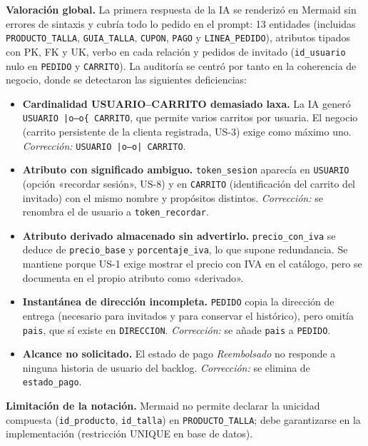 \textbf{Valoración global.} La primera respuesta de la IA se renderizó en Mermaid sin errores de sintaxis y cubría todo lo pedido en el prompt: 13 entidades (incluidas \texttt{PRODUCTO\_TALLA}, \texttt{GUIA\_TALLA}, \texttt{CUPON}, \texttt{PAGO} y \texttt{LINEA\_PEDIDO}), atributos tipados con PK, FK y UK, verbo en cada relación y pedidos de invitado (\texttt{id\_usuario} nulo en \texttt{PEDIDO} y \texttt{CARRITO}). La auditoría se centró por tanto en la coherencia de negocio, donde se detectaron las siguientes deficiencias:
\begin{itemize}[leftmargin=*,nosep]
\item \textbf{Cardinalidad USUARIO--CARRITO demasiado laxa.} La IA generó \texttt{USUARIO |o--o\{ CARRITO}, que permite varios carritos por usuaria. El negocio (carrito persistente de la clienta registrada, US-3) exige como máximo uno. \emph{Corrección:} \texttt{USUARIO |o--o| CARRITO}.
\item \textbf{Atributo con significado ambiguo.} \texttt{token\_sesion} aparecía en \texttt{USUARIO} (opción «recordar sesión», US-8) y en \texttt{CARRITO} (identificación del carrito del invitado) con el mismo nombre y propósitos distintos. \emph{Corrección:} se renombra el de usuario a \texttt{token\_recordar}.
\item \textbf{Atributo derivado almacenado sin advertirlo.} \texttt{precio\_con\_iva} se deduce de \texttt{precio\_base} y \texttt{porcentaje\_iva}, lo que supone redundancia. Se mantiene porque US-1 exige mostrar el precio con IVA en el catálogo, pero se documenta en el propio atributo como «derivado».
\item \textbf{Instantánea de dirección incompleta.} \texttt{PEDIDO} copia la dirección de entrega (necesario para invitados y para conservar el histórico), pero omitía \texttt{pais}, que sí existe en \texttt{DIRECCION}. \emph{Corrección:} se añade \texttt{pais} a \texttt{PEDIDO}.
\item \textbf{Alcance no solicitado.} El estado de pago \emph{Reembolsado} no responde a ninguna historia de usuario del backlog. \emph{Corrección:} se elimina de \texttt{estado\_pago}.
\end{itemize}
\textbf{Limitación de la notación.} Mermaid no permite declarar la unicidad compuesta (\texttt{id\_producto}, \texttt{id\_talla}) en \texttt{PRODUCTO\_TALLA}; debe garantizarse en la implementación (restricción UNIQUE en base de datos).
